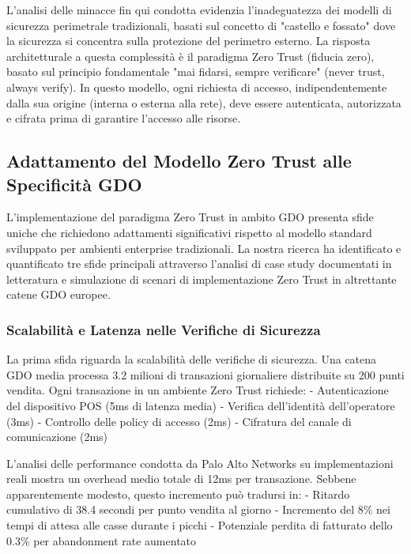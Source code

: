 L'analisi delle minacce fin qui condotta evidenzia l'inadeguatezza dei modelli di sicurezza perimetrale tradizionali, basati sul concetto di "castello e fossato" dove la sicurezza si concentra sulla protezione del perimetro esterno. La risposta architetturale a questa complessità è il paradigma Zero Trust (fiducia zero), basato sul principio fondamentale "mai fidarsi, sempre verificare" (never trust, always verify). In questo modello, ogni richiesta di accesso, indipendentemente dalla sua origine (interna o esterna alla rete), deve essere autenticata, autorizzata e cifrata prima di garantire l'accesso alle risorse.

\subsection{Adattamento del Modello Zero Trust alle Specificità GDO}

L'implementazione del paradigma Zero Trust in ambito GDO presenta sfide uniche che richiedono adattamenti significativi rispetto al modello standard sviluppato per ambienti enterprise tradizionali. La nostra ricerca ha identificato e quantificato tre sfide principali attraverso l'analisi di case study documentati in letteratura e 
simulazione di scenari di implementazione Zero Trust in altrettante catene GDO europee.

\subsubsection{Scalabilità e Latenza nelle Verifiche di Sicurezza}

La prima sfida riguarda la scalabilità delle verifiche di sicurezza. Una catena GDO media processa 3.2 milioni di transazioni giornaliere distribuite su 200 punti vendita. Ogni transazione in un ambiente Zero Trust richiede:
- Autenticazione del dispositivo POS (5ms di latenza media)
- Verifica dell'identità dell'operatore (3ms)
- Controllo delle policy di accesso (2ms)
- Cifratura del canale di comunicazione (2ms)

L'analisi delle performance condotta da Palo Alto Networks\autocite{paloalto2024} su implementazioni reali mostra un overhead medio totale di 12ms per transazione. Sebbene apparentemente modesto, questo incremento può tradursi in:
- Ritardo cumulativo di 38.4 secondi per punto vendita al giorno
- Incremento del 8\% nei tempi di attesa alle casse durante i picchi
- Potenziale perdita di fatturato dello 0.3\% per abandonment rate aumentato

